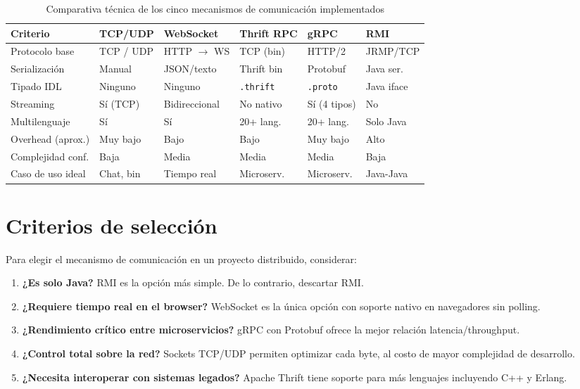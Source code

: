 \documentclass[12pt, a4paper, openany]{book}
\newcommand{\code}[1]{\texttt{\small#1}}
\begin{document}
	\begin{table}[H]
		\centering
		\caption{Comparativa técnica de los cinco mecanismos de comunicación implementados}
		\label{tab:comparativa_final}
		\setlength{\tabcolsep}{4pt}
		\begin{tabularx}{\linewidth}{@{}lXXXXX@{}}
			\toprule
			\textbf{Criterio} &
			\textbf{TCP/UDP} &
			\textbf{WebSocket} &
			\textbf{Thrift RPC} &
			\textbf{gRPC} &
			\textbf{RMI} \\
			\midrule
			Protocolo base    & TCP / UDP  & HTTP $\to$ WS & TCP (bin)   & HTTP/2     & JRMP/TCP \\
			Serialización     & Manual     & JSON/texto     & Thrift bin  & Protobuf   & Java ser.\\
			Tipado IDL        & Ninguno    & Ninguno        & \code{.thrift} & \code{.proto} & Java iface\\
			Streaming         & Sí (TCP)   & Bidireccional  & No nativo   & Sí (4 tipos)& No     \\
			Multilenguaje     & Sí         & Sí             & 20+ lang.   & 20+ lang.  & Solo Java\\
			Overhead (aprox.) & Muy bajo   & Bajo           & Bajo        & Muy bajo   & Alto     \\
			Complejidad conf. & Baja       & Media          & Media       & Media      & Baja     \\
			Caso de uso ideal & Chat, bin  & Tiempo real    & Microserv.  & Microserv. & Java-Java\\
			\bottomrule
		\end{tabularx}
	\end{table}
	
	\section{Criterios de selección}
	
	Para elegir el mecanismo de comunicación en un proyecto distribuido, considerar:
	
	\begin{enumerate}
		\item \textbf{¿Es solo Java?} RMI es la opción más simple. De lo contrario,
		descartar RMI.
		\item \textbf{¿Requiere tiempo real en el browser?} WebSocket es la única
		opción con soporte nativo en navegadores sin polling.
		\item \textbf{¿Rendimiento crítico entre microservicios?} gRPC con Protobuf
		ofrece la mejor relación latencia/throughput.
		\item \textbf{¿Control total sobre la red?} Sockets TCP/UDP permiten optimizar
		cada byte, al costo de mayor complejidad de desarrollo.
		\item \textbf{¿Necesita interoperar con sistemas legados?} Apache Thrift tiene
		soporte para más lenguajes incluyendo C++ y Erlang.
	\end{enumerate}
	
	\printbibliography[title={Referencias Bibliográficas}]
	
\end{document}

